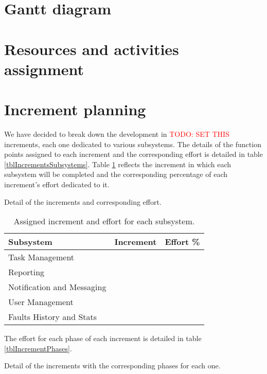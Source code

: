 

\section{Gantt diagram}

\section{Resources and activities assignment}

\section{Increment planning}

We have decided to break down the development in \textcolor{red}{TODO: SET THIS} increments, each one dedicated to various subsystems. The details of the function points assigned to each increment and the corresponding effort is detailed in table \ref{tblIncrementsSubsystems}. Table \ref{tblSubsystemsAssignedIncrement} reflects the increment in which each subsystem will be completed and the corresponding percentage of each increment's effort dedicated to it.

\begin{table}[hbtp]
\centering

\caption{Detail of the increments and corresponding effort.}
\label{tblIncrementsSubsystems}
\end{table}

\begin{table}[hbtp]
\centering
\begin{tabular}{l|c|c}
\textbf{Subsystem} & \textbf{Increment} & \textbf{Effort \%}  \\ \hline
Task Management & & \\
Reporting & & \\
Notification and Messaging & & \\
User Management & & \\
Faults History and Stats & & \\
\end{tabular}
\caption{Assigned increment and effort for each subsystem.}
\label{tblSubsystemsAssignedIncrement}
\end{table}

The effort for each phase of each increment is detailed in table \ref{tblIncrementPhases}.

\begin{table}[hbtp]
\centering

\caption{Detail of the increments with the corresponding phases for each one.}
\label{tblIncrementPhases}
\end{table}

